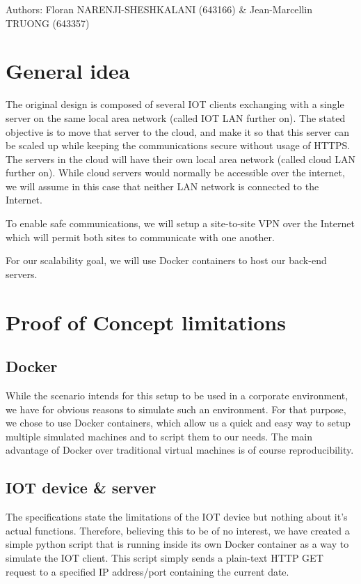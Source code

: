 \documentclass[paper=a4, fontsize=11pt]{scrartcl}
\author{Floran NARENJI-SHESHKALANI \& Jean-Marcellin TRUONG}
\begin{document}
Authors: Floran NARENJI-SHESHKALANI (643166) \& Jean-Marcellin TRUONG (643357)

\section{General idea}

The original design is composed of several IOT clients exchanging with a single
server on the same local area network (called IOT LAN further on).
The stated objective is to move that server to the cloud, and make it so that
this server can be scaled up while keeping the communications secure without
usage of HTTPS\@.
The servers in the cloud will have their own local area network (called cloud
LAN further on).
While cloud servers would normally be accessible over the internet, we will
assume in this case that neither LAN network is connected to the Internet.

To enable safe communications, we will setup a site-to-site VPN over the
Internet which will permit both sites to communicate with one another.

For our scalability goal, we will use Docker containers to host our back-end
servers.

\section{Proof of Concept limitations}

\subsection{Docker}

While the scenario intends for this setup to be used in a corporate environment,
we have for obvious reasons to simulate such an environment.
For that purpose, we chose to use Docker containers, which allow us a quick and
easy way to setup multiple simulated machines and to script them to our needs.
The main advantage of Docker over traditional virtual machines is of course
reproducibility.

\subsection{IOT device \& server}

The specifications state the limitations of the IOT device but nothing about
it's actual functions.
Therefore, believing this to be of no interest, we have created a simple python
script that is running inside its own Docker container as a way to simulate the
IOT client.
This script simply sends a plain-text HTTP GET request to a specified IP
address/port containing the current date.
\end{document}
